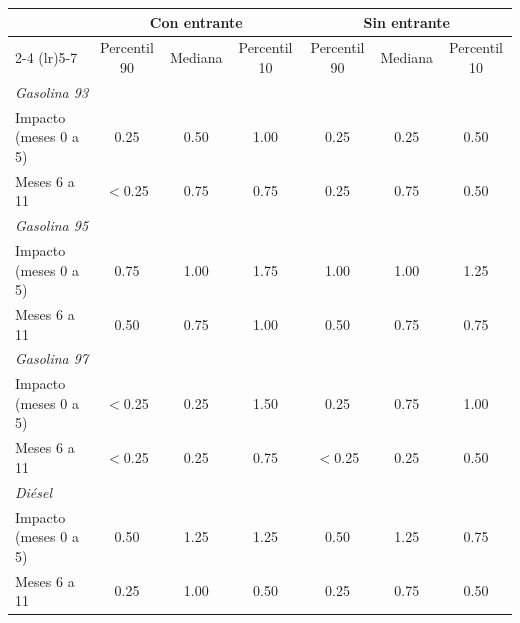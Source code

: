 \begin{tabular}{lcccccc}
\toprule
 & \multicolumn{3}{c}{Con entrante} & \multicolumn{3}{c}{Sin entrante} \\
\cmidrule(lr){2-4} \cmidrule(lr){5-7}
 & Percentil 90 & Mediana & Percentil 10 & Percentil 90 & Mediana & Percentil 10 \\
\midrule
\multicolumn{7}{l}{\emph{Gasolina 93}} \\
\quad Impacto (meses 0 a 5) & 0.25 & 0.50 & 1.00 & 0.25 & 0.25 & 0.50 \\
\quad Meses 6 a 11 & $<$0.25 & 0.75 & 0.75 & 0.25 & 0.75 & 0.50 \\
\multicolumn{7}{l}{\emph{Gasolina 95}} \\
\quad Impacto (meses 0 a 5) & 0.75 & 1.00 & 1.75 & 1.00 & 1.00 & 1.25 \\
\quad Meses 6 a 11 & 0.50 & 0.75 & 1.00 & 0.50 & 0.75 & 0.75 \\
\multicolumn{7}{l}{\emph{Gasolina 97}} \\
\quad Impacto (meses 0 a 5) & $<$0.25 & 0.25 & 1.50 & 0.25 & 0.75 & 1.00 \\
\quad Meses 6 a 11 & $<$0.25 & 0.25 & 0.75 & $<$0.25 & 0.25 & 0.50 \\
\multicolumn{7}{l}{\emph{Diésel}} \\
\quad Impacto (meses 0 a 5) & 0.50 & 1.25 & 1.25 & 0.50 & 1.25 & 0.75 \\
\quad Meses 6 a 11 & 0.25 & 1.00 & 0.50 & 0.25 & 0.75 & 0.50 \\
\bottomrule
\end{tabular}
